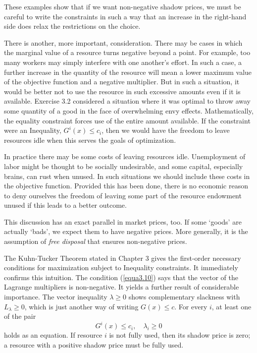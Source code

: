 These examples show that if we want non-negative shadow prices, we must be careful to write the constraints in such a way that an increase in the right-hand side does relax the restrictions on the choice.

There is another, more important, consideration. There may be cases in which the marginal value of a resource turns negative beyond a point. For example, too many workers may simply interfere with one another's effort. In such a case, a further increase in the quantity of the resource will mean a lower maximum value of the objective function and a negative multiplier. But in such a situation, it would be better not to use the resource in such excessive amounts even if it is available. Exercise 3.2 considered a situation where it was optimal to throw away some quantity of a good in the face of overwhelming envy effects. Mathematically, the equality constraint forces use of the entire amount available. If the constraint were an Inequality, $G^i(x) \leq c_i$, then we would have the freedom to leave resources idle when this serves the goals of optimization.

In practice there may be some costs of leaving resources idle. Unemployment of labor might be thought to be socially undesirable, and some capital, especially brains, can rust when unused. In such situations we should include these costs in the objective function. Provided this has been done, there is no economic reason to deny ourselves the freedom of leaving some part of the resource endowment unused if this leads to a better outcome.

This discussion has an exact parallel in market prices, too. If some `goods' are actually `bads', we expect them to have negative prices. More generally, it is the assumption of \textit{free disposal} that ensures non-negative prices.

The Kuhn-Tucker Theorem stated in Chapter 3 gives the first-order necessary conditions for maximization subject to Inequality constraints. It immediately confirms this intuition. The condition (\ref{equa3.10}) says that the vector of the Lagrange multipliers is non-negative. It yields a further result of considerable importance. The vector inequality $\lambda \geq 0$ shows complementary slackness with $L_\lambda \geq 0$, which is just another way of writing $G(x) \leq c$. For every $i$, at least one of the pair
\begin{equation*}
G^i(x) \leq c_i, \quad \lambda_i \geq 0
\end{equation*}
holds as an equation. If resource $i$ is not fully used, then its shadow price is zero; a resource with a positive shadow price must be fully used.

